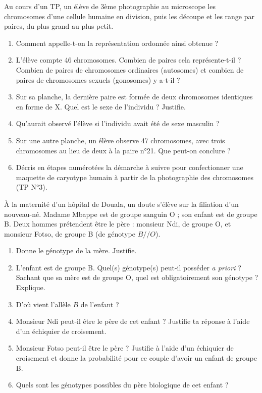 \documentclass[11pt]{article}
\newcounter{popsec}
\newcounter{popsub}
\newcommand{\courssub}[1]{%
  \stepcounter{popsub}%
  \par\vspace{9pt}\noindent{\popxbold\fontsize{11.5}{13}\selectfont\color{popink}{\color{poporange}\thepopsec.\thepopsub}\hspace{6pt}#1}\par\nopagebreak\vspace{4pt}
}
\begin{document}
\courssub{Je me prépare au BEPC}

\begin{exercice}
Au cours d'un TP, un élève de 3ème photographie au microscope les chromosomes d'une cellule humaine en division, puis les découpe et les range par paires, du plus grand au plus petit.
\begin{enumerate}
\item Comment appelle-t-on la représentation ordonnée ainsi obtenue ?
\item L'élève compte 46 chromosomes. Combien de paires cela représente-t-il ? Combien de paires de chromosomes ordinaires (autosomes) et combien de paires de chromosomes sexuels (gonosomes) y a-t-il ?
\item Sur sa planche, la dernière paire est formée de deux chromosomes identiques en forme de X. Quel est le sexe de l'individu ? Justifie.
\item Qu'aurait observé l'élève si l'individu avait été de sexe masculin ?
\item Sur une autre planche, un élève observe 47 chromosomes, avec trois chromosomes au lieu de deux à la paire n°21. Que peut-on conclure ?
\item Décris en étapes numérotées la démarche à suivre pour confectionner une maquette de caryotype humain à partir de la photographie des chromosomes (TP N°3).
\end{enumerate}
\end{exercice}

\begin{exercice}
À la maternité d'un hôpital de Douala, un doute s'élève sur la filiation d'un nouveau-né. Madame Mbappe est de groupe sanguin O ; son enfant est de groupe B. Deux hommes prétendent être le père : monsieur Ndi, de groupe O, et monsieur Fotso, de groupe B (de génotype $B//O$).
\begin{enumerate}
\item Donne le génotype de la mère. Justifie.
\item L'enfant est de groupe B. Quel(s) génotype(s) peut-il posséder \emph{a priori} ? Sachant que sa mère est de groupe O, quel est obligatoirement son génotype ? Explique.
\item D'où vient l'allèle $B$ de l'enfant ?
\item Monsieur Ndi peut-il être le père de cet enfant ? Justifie ta réponse à l'aide d'un échiquier de croisement.
\item Monsieur Fotso peut-il être le père ? Justifie à l'aide d'un échiquier de croisement et donne la probabilité pour ce couple d'avoir un enfant de groupe B.
\item Quels sont les génotypes possibles du père biologique de cet enfant ?
\end{enumerate}
\end{exercice}
\end{document}
